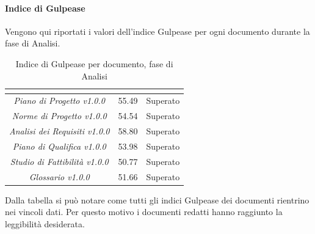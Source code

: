 \paragraph{Indice di Gulpease} \Spazio
Vengono qui riportati i valori dell'indice Gulpease per ogni documento durante la fase di Analisi. 
\renewcommand{\arraystretch}{1.5}
\begin{table}[H]
\begin{center}
\begin{tabular}{|c|c|c|}
\hline
\rowcolor{title_row}
\textbf{\color{title_text}{Documento}} & \textbf{\color{title_text}{Valore indice}} & \textbf{\color{title_text}{Esito}} \\
\hline
	\emph{Piano di Progetto v1.0.0} & {55.49} & {Superato}\\
\hline
	\emph{Norme di Progetto v1.0.0} & {54.54} & {Superato}\\
\hline
	\emph{Analisi dei Requisiti v1.0.0} & {58.80} & {Superato}\\
\hline
	\emph{Piano di Qualifica v1.0.0} & {53.98} & {Superato}\\
\hline
	\emph{Studio di Fattibilità v1.0.0} & {50.77} & {Superato}\\
\hline
	\emph{Glossario v1.0.0} & {51.66} & {Superato}\\
\hline
\end{tabular}
\caption[Esiti verifica documenti, Analisi]{Indice di Gulpease per documento, fase di Analisi}
\label{tabella:verifica documenti}
\end{center}
\end{table}
\renewcommand{\arraystretch}{1}

Dalla tabella si può notare come tutti gli indici Gulpease dei documenti rientrino nei vincoli dati. Per questo motivo i documenti redatti hanno raggiunto la leggibilità desiderata.

